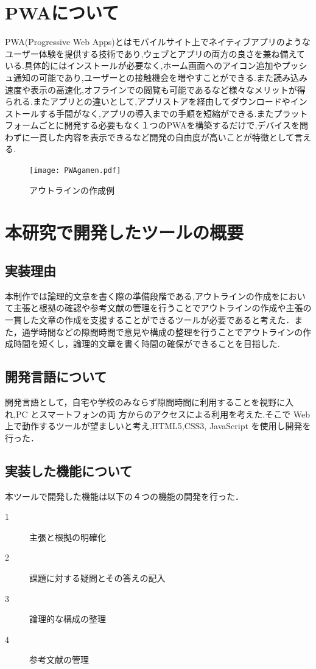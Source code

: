 \documentclass[a4j,12pt]{jarticle}
\begin{document}
\newpage
\section{PWAについて}

PWA(Progressive Web Apps)とはモバイルサイト上でネイティブアプリのようなユーザー体験を提供する技術であり,ウェブとアプリの両方の良さを兼ね備えている.具体的にはインストールが必要なく,ホーム画面へのアイコン追加やプッシュ通知の可能であり,ユーザーとの接触機会を増やすことができる.また読み込み速度や表示の高速化,オフラインでの閲覧も可能であるなど様々なメリットが得られる.またアプリとの違いとして,アプリストアを経由してダウンロードやインストールする手間がなく,アプリの導入までの手順を短縮ができる.またプラットフォームごとに開発する必要もなく１つのPWAを構築するだけで,デバイスを問わずに一貫した内容を表示できるなど開発の自由度が高いことが特徴として言える\cite{ren6}.
\begin{figure}[h]
\begin{center}
 \texttt{[image: PWAgamen.pdf]}
\end{center}
 \caption{アウトラインの作成例}
 \label{fig:f}
\end{figure}
\newpage

\section{本研究で開発したツールの概要}
\subsection{実装理由}
本制作では論理的文章を書く際の準備段階である,アウトラインの作成をにおいて主張と根拠の確認や参考文献の管理を行うことでアウトラインの作成や主張の一貫した文章の作成を支援することができるツールが必要であると考えた．また，通学時間などの隙間時間で意見や構成の整理を行うことでアウトラインの作成時間を短くし，論理的文章を書く時間の確保ができることを目指した.

\subsection{開発言語について}
開発言語として，自宅や学校のみならず隙間時間に利用することを視野に入れ,PC とスマートフォンの両
方からのアクセスによる利用を考えた.そこで Web 上で動作するツールが望ましいと考え,HTML5,CSS3, JavaScript を使用し開発を行った．
\subsection{実装した機能について}
本ツールで開発した機能は以下の４つの機能の開発を行った．
\begin{description}
  \item[\textcircled{\scriptsize 1}]主張と根拠の明確化
  \item[\textcircled{\scriptsize 2}]課題に対する疑問とその答えの記入
  \item[\textcircled{\scriptsize 3}]論理的な構成の整理
  \item[\textcircled{\scriptsize 4}]参考文献の管理
 \end{description}
\end{document}
